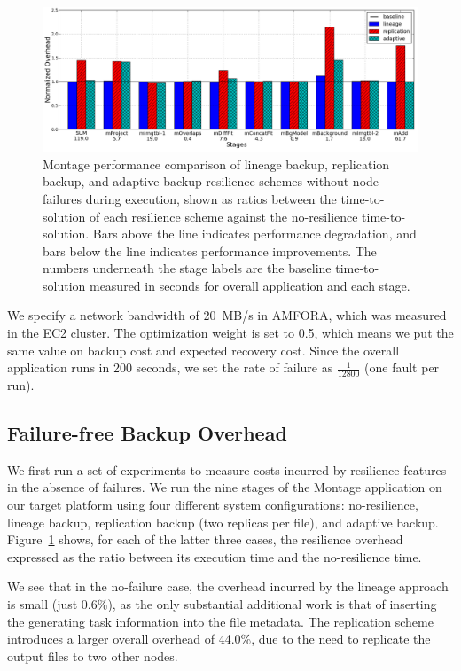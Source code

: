 \documentclass{sig-alternate}
\begin{document}
\begin{figure}[ht]
	\begin{center}
		\includegraphics[width=160mm]{pictures/no-failure.png}
		\vspace{-10pt}
		\caption{Montage performance comparison of lineage backup, replication backup, and adaptive backup
		resilience schemes without node failures during execution, shown as ratios between the time-to-solution 
		of each resilience scheme against the no-resilience time-to-solution. Bars above the line indicates performance degradation,
		and bars below the line indicates performance improvements. The numbers underneath the stage labels are the baseline time-to-solution measured in seconds for overall application and each stage.
		\label{fig:montage}}
  	\end{center}
\end{figure}

We specify a network bandwidth of 20~MB/s in AMFORA, which was measured in the EC2 cluster. The optimization weight is set to 0.5, which means we put the same value on backup cost and expected recovery cost. Since the overall application runs in 200 seconds, we set the rate of failure as $\frac{1}{12800}$ (one fault per run).


\subsection{Failure-free Backup Overhead}
We first run a set of experiments to measure costs incurred by resilience features in the absence of failures.
We run the nine stages
of the Montage application on our target platform using four different system configurations: no-resilience, lineage backup,
replication backup (two replicas per file), and adaptive backup.
Figure~\ref{fig:montage} shows, for each of the latter three cases, the resilience overhead expressed as
the ratio between its execution time and the no-resilience time.

We see that in the no-failure case, the overhead incurred by the lineage approach is small (just 0.6\%),
as the only substantial additional work is that of inserting the generating task information into the file metadata.
The replication scheme introduces a larger overall overhead of 44.0\%, due to the need to replicate the output files
to two other nodes.
\end{document}
